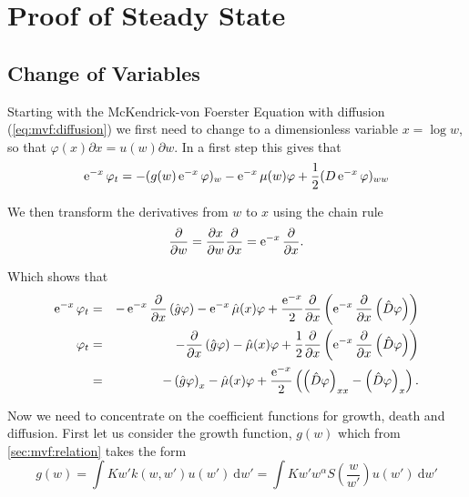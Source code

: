 \documentclass[../main.tex]{subfiles}
\begin{document}
  \chapter{Proof of Steady State}\label{app:chap:derivation}
  \section{Change of Variables}\label{app:sec:cov}
  Starting with the McKendrick-von Foerster Equation with diffusion (\autoref{eq:mvf:diffusion}) we first need to change to a dimensionless variable $x = \log{w}$, so that $\varphi(x) \partial x = u(w) \partial w$. In a first step this gives that
  \begin{equation}
    \operatorname{e}^{-x}\varphi_t = - (g(w) \operatorname{e}^{-x} \varphi)_w - \operatorname{e}^{-x} \mu(w) \varphi + \frac{1}{2}(D \operatorname{e}^{-x}\varphi)_{ww}
  \end{equation}

  We then transform the derivatives from $w$ to $x$ using the chain rule
  \begin{equation}
    \frac{\partial}{\partial w}
    = \frac{\partial x}{\partial w} \frac{\partial}{\partial x} = \operatorname{e}^{-x} \frac{\partial}{\partial x}.
  \end{equation}

  Which shows that
  \begin{eqnarray}
    \operatorname{e}^{-x}\varphi_t
    &=& -\operatorname{e}^{-x} \frac{\partial}{\partial x} \left(\hat{g} \varphi \right) - \operatorname{e}^{-x} \hat{\mu}(x) \varphi + \frac{\operatorname{e}^{-x}}{2} \frac{\partial}{\partial x} \left( \operatorname{e}^{-x} \frac{\partial}{\partial x} \left( \hat{D} \varphi \right) \right) \nonumber \\
    \varphi_t
    &=& - \frac{\partial}{\partial x} \left(\hat{g} \varphi \right) - \hat{\mu}(x) \varphi + \frac{1}{2} \frac{\partial}{\partial x} \left( \operatorname{e}^{-x} \frac{\partial}{\partial x} \left( \hat{D} \varphi \right) \right) \nonumber \\
    &=& - \left(\hat{g} \varphi \right)_x - \hat{\mu}(x) \varphi + \frac{\operatorname{e}^{-x}}{2} \left( \left( \hat{D} \varphi \right)_{xx} - \left( \hat{D} \varphi \right)_x \right). \label{app:eq:cov}
  \end{eqnarray}

  Now we need to concentrate on the coefficient functions for growth, death and diffusion. First let us consider the growth function, $g(w)$ which from \autoref{sec:mvf:relation} takes the form
  \begin{equation}
    g(w) = \int K w' k(w, w') u(w') \: \mathrm{d} w' = \int K w' w^{\alpha} S \left( \frac{w}{w'} \right) u(w') \: \mathrm{d} w'
  \end{equation}
\end{document}
